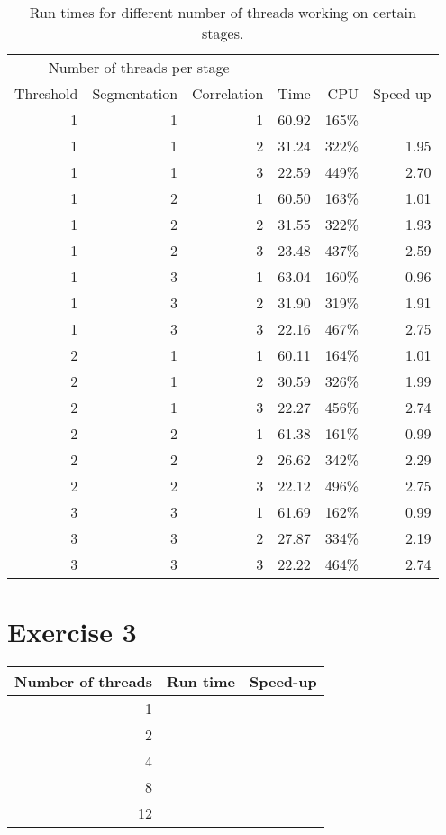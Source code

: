 \documentclass[a4paper]{article}
\begin{document}
\begin{table}[h]
	\centering
	\label{tbl:ex2}
	\caption{Run times for different number of threads working on certain stages.}
	\begin{tabular}{r|r|r|r|r|r}
		\multicolumn{3}{c|}{Number of threads per stage} & \multicolumn{2}{c}{}\\
		Threshold & Segmentation & Correlation & Time & CPU & Speed-up \\ \hline
		1 & 1 & 1 & 60.92 & 165\% &  \\
		1 & 1 & 2 & 31.24 & 322\% & 1.95 \\
		1 & 1 & 3 & 22.59 & 449\% & 2.70 \\
		1 & 2 & 1 & 60.50 & 163\% & 1.01 \\
		1 & 2 & 2 & 31.55 & 322\% & 1.93 \\
		1 & 2 & 3 & 23.48 & 437\% & 2.59 \\
		1 & 3 & 1 & 63.04 & 160\% & 0.96 \\
		1 & 3 & 2 & 31.90 & 319\% & 1.91 \\
		1 & 3 & 3 & 22.16 & 467\% & 2.75 \\
		2 & 1 & 1 & 60.11 & 164\% & 1.01 \\
		2 & 1 & 2 & 30.59 & 326\% & 1.99 \\
		2 & 1 & 3 & 22.27 & 456\% & 2.74 \\
		2 & 2 & 1 & 61.38 & 161\% & 0.99 \\
		2 & 2 & 2 & 26.62 & 342\% & 2.29 \\
		2 & 2 & 3 & 22.12 & 496\% & 2.75 \\
		3 & 3 & 1 & 61.69 & 162\% & 0.99 \\
		3 & 3 & 2 & 27.87 & 334\% & 2.19 \\
		3 & 3 & 3 & 22.22 & 464\% & 2.74 \\
	\end{tabular}
\end{table}

\section{Exercise 3}

\begin{table}
	\begin{tabular}{r|r|r}
		Number of threads & Run time & Speed-up \\ \hline
		 1 &  &  \\
		 2 &  &  \\
		 4 &  &  \\
		 8 &  &  \\
		12 &  &  \\
	\end{tabular}
\end{table}
\end{document}
